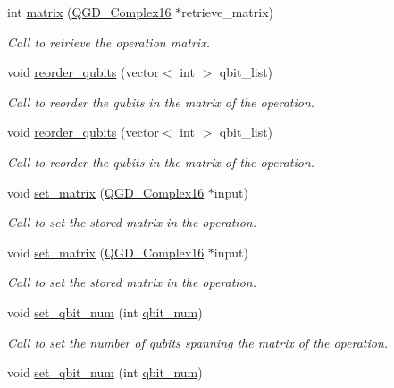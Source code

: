 \begin{DoxyCompactItemize}
int \hyperlink{class_c_n_o_t_a8c9e4d814e5e883e0e10eb0a1e1dafe3}{matrix} (\hyperlink{struct_q_g_d___complex16}{Q\+G\+D\+\_\+\+Complex16} $\ast$retrieve\+\_\+matrix)
\begin{DoxyCompactList}\small\item\em Call to retrieve the operation matrix. \end{DoxyCompactList}\item 
void \hyperlink{class_c_n_o_t_a2685ba9fe5fa414609a8ea6a9c2d18c7}{reorder\+\_\+qubits} (vector$<$ int $>$ qbit\+\_\+list)
\begin{DoxyCompactList}\small\item\em Call to reorder the qubits in the matrix of the operation. \end{DoxyCompactList}\item 
void \hyperlink{class_c_n_o_t_a2685ba9fe5fa414609a8ea6a9c2d18c7}{reorder\+\_\+qubits} (vector$<$ int $>$ qbit\+\_\+list)
\begin{DoxyCompactList}\small\item\em Call to reorder the qubits in the matrix of the operation. \end{DoxyCompactList}\item 
void \hyperlink{class_operation_a026d3dcf0ad00af99c7a9097d3cf1c74}{set\+\_\+matrix} (\hyperlink{struct_q_g_d___complex16}{Q\+G\+D\+\_\+\+Complex16} $\ast$input)
\begin{DoxyCompactList}\small\item\em Call to set the stored matrix in the operation. \end{DoxyCompactList}\item 
void \hyperlink{class_operation_a026d3dcf0ad00af99c7a9097d3cf1c74}{set\+\_\+matrix} (\hyperlink{struct_q_g_d___complex16}{Q\+G\+D\+\_\+\+Complex16} $\ast$input)
\begin{DoxyCompactList}\small\item\em Call to set the stored matrix in the operation. \end{DoxyCompactList}\item 
void \hyperlink{class_c_n_o_t_a8272bf6e7ce6705a87d1ae9ef1e09418}{set\+\_\+qbit\+\_\+num} (int \hyperlink{class_operation_aecd5fbf1dd4ea532b2e58471ff8bad69}{qbit\+\_\+num})
\begin{DoxyCompactList}\small\item\em Call to set the number of qubits spanning the matrix of the operation. \end{DoxyCompactList}\item 
void \hyperlink{class_c_n_o_t_a8272bf6e7ce6705a87d1ae9ef1e09418}{set\+\_\+qbit\+\_\+num} (int \hyperlink{class_operation_aecd5fbf1dd4ea532b2e58471ff8bad69}{qbit\+\_\+num})

\end{DoxyCompactItemize}
